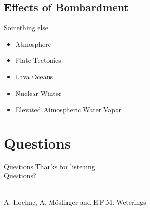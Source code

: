 \documentclass[11pt, aspectratio=169]{beamer}
\begin{document}
\subsection{Effects of Bombardment}
\begin{frame}[t]{Something else}
\begin{itemize}
	\item Atmosphere
	\item Plate Tectonics
	\item Lava Oceans
	\item Nuclear Winter
	\item Elevated Atmospheric Water Vapor
\end{itemize}
	
	
\end{frame}



\section{Questions}
\begin{frame}{Questions}
\centering
\Huge Thanks for listening\\

\huge Questions?\\\

\large A. Hoehne, A. M\"{o}slinger and E.F.M. Weterings\\

\end{frame}
\end{document}
